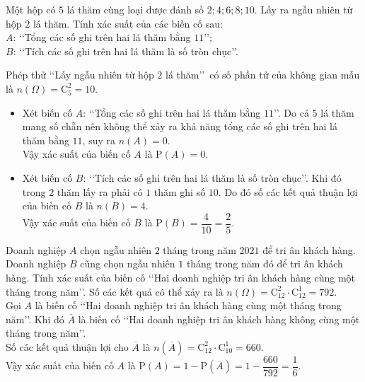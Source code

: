 \begin{bt}%
	Một hộp có $5$ lá thăm cùng loại được đánh số $2;4;6;8;10$. Lấy ra ngẫu nhiên từ hộp $2$ lá thăm. Tính xác suất của các biến cố sau:\\
	$A$: \lq\lq Tổng các số ghi trên hai lá thăm bằng $11$\rq\rq;\\
	$B$: \lq\lq Tích các số ghi trên hai lá thăm là số tròn chục\rq\rq.
	\loigiai
	{Phép thử \lq\lq Lấy ngẫu nhiên từ hộp $2$ lá thăm\rq\rq\, có số phần tử của không gian mẫu là $n(\Omega)=\mathrm{C}_5^2=10$.
		\begin{itemize}
			\item Xét biến cố $A$: \lq\lq Tổng các số ghi trên hai lá thăm bằng $11$\rq\rq. Do cả $5$ lá thăm mang số chẵn nên không thể xảy ra khả năng tổng các số ghi trên hai lá thăm bằng $11$, suy ra $n(A)=0$.\\
			Vậy xác suất của biến cố $A$ là $\mathrm{P}(A)=0$.
			\item Xét biến cố $B$: \lq\lq Tích các số ghi trên hai lá thăm là số tròn chục\rq\rq. Khi đó trong $2$ thăm lấy ra phải có $1$ thăm ghi số $10$. Do đó số các kết quả thuận lợi của biến cố $B$ là $n(B)=4$.\\
			Vậy xác suất của biến cố $B$ là $\mathrm{P}(B)=\dfrac{4}{10}=\dfrac{2}{5}$. 
	\end{itemize}}
\end{bt}

\begin{bt}%
	Doanh nghiệp $A$ chọn ngẫu nhiên $2$ tháng trong năm $2021$ để tri ân khách hàng. Doanh nghiệp $B$ cũng chọn ngẫu nhiên $1$ tháng trong năm đó để tri ân khách hàng. Tính xác suất của biến cố \lq\lq Hai doanh nghiệp tri ân khách hàng cùng một tháng trong năm\rq\rq.
	\loigiai
	{Số các kết quả có thể xảy ra là $n(\Omega)=\mathrm{C}_{12}^2 \cdot \mathrm{C}_{12}^1 = 792$.\\
		Gọi $A$ là biến cố \lq\lq Hai doanh nghiệp tri ân khách hàng cùng một tháng trong năm\rq\rq. Khi đó $\overline{A}$ là biến cố \lq\lq Hai doanh nghiệp tri ân khách hàng không cùng một tháng trong năm\rq\rq.\\
		Số các kết quả thuận lợi cho $\overline{A}$ là $n\left(\overline{A}\right)=\mathrm{C}_{12}^2 \cdot \mathrm{C}_{10}^1 = 660$.\\
		Vậy xác suất của biến cố $A$ là $\mathrm{P}(A)= 1-\mathrm{P}\left(\overline{A}\right) = 1-\dfrac{660}{792}=\dfrac{1}{6}$.}
\end{bt}

